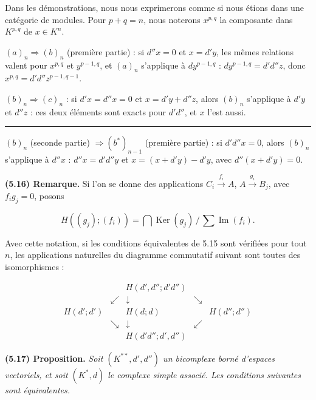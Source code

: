 \documentclass[
  french,
  a3paper,
  a3paper]{extarticle}
\begin{document}
Dans les démonstrations, nous nous exprimerons comme si nous étions dans
une catégorie de modules. Pour \(p+q=n\), nous noterons \(x^{p,q}\) la
composante dans \(K^{p,q}\) de \(x\in K^n\).

\((a)_n\Rightarrow(b)_n\) (première partie) : si \(d''x=0\) et
\(x=d'y\), les mêmes relations valent pour \(x^{p,q}\) et \(y^{p-1,q}\),
et \((a)_n\) s'applique à \(dy^{p-1,q}\) : \(dy^{p-1,q}=d'd''z\), donc
\(x^{p,q}=d'd''z^{p-1,q-1}\).

\((b)_n\Rightarrow(c)_n\) : si \(d'x=d''x=0\) et \(x=d'y+d''z\), alors
\((b)_n\) s'applique à \(d'y\) et \(d''z\) : ces deux éléments sont
exacts pour \(d'd''\), et \(x\) l'est aussi.

\clearpage



\par

\vspace{0.7mm}\hrule\vspace{1.6mm}

\fontsize{9}{11}\selectfont

\((b)_n\) (seconde partie) \(\Rightarrow(b^*)_{n-1}\) (première partie)
: si \(d'd''x=0\), alors \((b)_n\) s'applique à \(d''x\) :
\(d''x=d'd''y\) et \(x=(x+d'y)-d'y\), avec \(d''(x+d'y)=0\).

\textbf{(5.16) Remarque.} Si l'on se donne des applications
\(C_i\xrightarrow{f_i}A\), \(A\xrightarrow{g_i}B_j\), avec \(f_ig_j=0\),
posons

\[H((g_j);(f_i))=\bigcap\operatorname{Ker}(g_j)\,/\,\sum\operatorname{Im}(f_i).\]

Avec cette notation, si les conditions équivalentes de 5.15 sont
vérifiées pour tout \(n\), les applications naturelles du diagramme
commutatif suivant sont toutes des isomorphismes :

\[\begin{array}{ccccc}&&H(d',d'';d'd'')&&\\&\swarrow&\downarrow&\searrow&\\H(d';d')&&H(d;d)&&H(d'';d'')\\&\searrow&\downarrow&\swarrow&\\&&H(d'd'';d',d'')&&\end{array}\]

\textbf{(5.17) Proposition.} \emph{Soit \((K^{**},d',d'')\) un
bicomplexe borné d'espaces vectoriels, et soit \((K^*,d)\) le complexe
simple associé. Les conditions suivantes sont équivalentes.}
\end{document}
